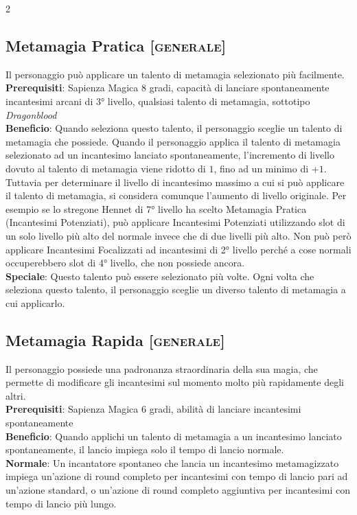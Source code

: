 \documentclass[10pt, a4paper]{report}
\begin{document}
\begin{multicols}{2}
\subsection{Metamagia Pratica [\textsc{generale}]}
Il personaggio può applicare un talento di metamagia selezionato più facilmente.\\
\textbf{Prerequisiti}: Sapienza Magica 8 gradi, capacità di lanciare spontaneamente incantesimi arcani di 3° livello, qualsiasi talento di metamagia, sottotipo \textit{Dragonblood}\\
\textbf{Beneficio}: Quando seleziona questo talento, il personaggio sceglie un talento di metamagia che possiede. Quando il personaggio applica il talento di metamagia selezionato ad un incantesimo lanciato spontaneamente, l'incremento di livello dovuto al talento di metamagia viene ridotto di $1$, fino ad un minimo di +$1$. Tuttavia per determinare il livello di incantesimo massimo a cui si può applicare il talento di metamagia, si considera comunque l'aumento di livello originale.
Per esempio se lo stregone Hennet di 7° livello ha scelto Metamagia Pratica (Incantesimi Potenziati), può applicare Incantesimi Potenziati utilizzando slot di un solo livello più alto del normale invece che di due livelli più alto. Non può però applicare Incantesimi Focalizzati ad incantesimi di 2° livello perché a cose normali occuperebbero slot di 4° livello, che non possiede ancora.\\
\textbf{Speciale}: Questo talento può essere selezionato più volte. Ogni volta che seleziona questo talento, il personaggio sceglie un diverso talento di metamagia a cui applicarlo.

\subsection{Metamagia Rapida [\textsc{generale}]}
\label{rapidmetamagic}
Il personaggio possiede una padronanza straordinaria della sua magia, che permette di modificare gli incantesimi sul momento molto più rapidamente degli altri.\\
\textbf{Prerequisiti}: Sapienza Magica 6 gradi, abilità di lanciare incantesimi spontaneamente\\
\textbf{Beneficio}: Quando applichi un talento di metamagia a un incantesimo lanciato spontaneamente, il lancio impiega solo il tempo di lancio normale.\\
\textbf{Normale}: Un incantatore spontaneo che lancia un incantesimo metamagizzato impiega un'azione di round completo per incantesimi con tempo di lancio pari ad un'azione standard, o un'azione di round completo aggiuntiva per incantesimi con tempo di lancio più lungo.


\end{multicols}
\end{document}
